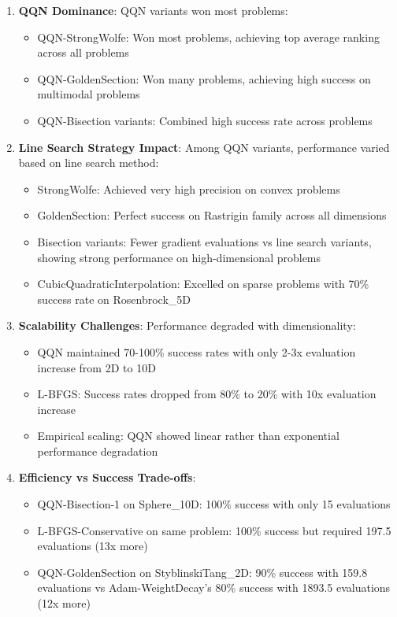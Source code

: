 \begin{enumerate}
\def\labelenumi{\arabic{enumi}.}
\tightlist
\item
  \textbf{QQN Dominance}: QQN variants won most problems:

  \begin{itemize}
  \tightlist
  \item
    QQN-StrongWolfe: Won most problems, achieving top average ranking across all problems
  \item
    QQN-GoldenSection: Won many problems, achieving high success on multimodal problems
  \item
    QQN-Bisection variants: Combined high success rate across problems
  \end{itemize}
\item
  \textbf{Line Search Strategy Impact}: Among QQN variants, performance varied based on line search method:

  \begin{itemize}
  \tightlist
  \item
    StrongWolfe: Achieved very high precision on convex problems
  \item
    GoldenSection: Perfect success on Rastrigin family across all dimensions
  \item
    Bisection variants: Fewer gradient evaluations vs line search variants, showing strong performance on high-dimensional problems
  \item
    CubicQuadraticInterpolation: Excelled on sparse problems with 70\% success rate on Rosenbrock\_5D
  \end{itemize}
\item
  \textbf{Scalability Challenges}: Performance degraded with dimensionality:

  \begin{itemize}
  \tightlist
  \item
    QQN maintained 70-100\% success rates with only 2-3x evaluation increase from 2D to 10D
  \item
    L-BFGS: Success rates dropped from 80\% to 20\% with 10x evaluation increase
  \item
    Empirical scaling: QQN showed linear rather than exponential performance degradation
  \end{itemize}
\item
  \textbf{Efficiency vs Success Trade-offs}:

  \begin{itemize}
  \tightlist
  \item
    QQN-Bisection-1 on Sphere\_10D: 100\% success with only 15 evaluations
  \item
    L-BFGS-Conservative on same problem: 100\% success but required 197.5 evaluations (13x more)
  \item
    QQN-GoldenSection on StyblinskiTang\_2D: 90\% success with 159.8 evaluations vs Adam-WeightDecay's 80\% success with 1893.5 evaluations (12x more)
  \end{itemize}
\end{enumerate}

